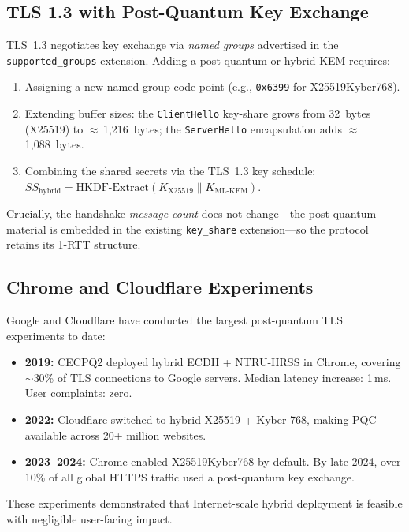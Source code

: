 \subsection{TLS 1.3 with Post-Quantum Key Exchange}
\label{subsec:tls13-pq}

TLS~1.3 negotiates key exchange via \emph{named groups} advertised in the \texttt{supported\_groups} extension.  Adding a post-quantum or hybrid KEM requires:
\begin{enumerate}
\item Assigning a new named-group code point (e.g., \texttt{0x6399} for X25519Kyber768).
\item Extending buffer sizes: the \texttt{ClientHello} key-share grows from 32~bytes (X25519) to $\approx$\,1{,}216~bytes; the \texttt{ServerHello} encapsulation adds $\approx$\,1{,}088~bytes.
\item Combining the shared secrets via the TLS~1.3 key schedule: $\mathit{SS}_{\mathrm{hybrid}} = \mathrm{HKDF\text{-}Extract}(K_{\mathrm{X25519}} \| K_{\mathrm{ML\text{-}KEM}})$.
\end{enumerate}

Crucially, the handshake \emph{message count} does not change---the post-quantum material is embedded in the existing \texttt{key\_share} extension---so the protocol retains its 1-RTT structure.

\subsection{Chrome and Cloudflare Experiments}
\label{subsec:chrome-cloudflare}

\begin{example}
\label{ex:cecpq2}
Google and Cloudflare have conducted the largest post-quantum TLS experiments to date:
\begin{itemize}
\item \textbf{2019:} CECPQ2 deployed hybrid ECDH + NTRU-HRSS in Chrome, covering $\sim$30\% of TLS connections to Google servers.  Median latency increase: 1\,ms.  User complaints: zero.
\item \textbf{2022:} Cloudflare switched to hybrid X25519 + Kyber-768, making PQC available across 20+ million websites.
\item \textbf{2023--2024:} Chrome enabled X25519Kyber768 by default.  By late 2024, over 10\% of all global HTTPS traffic used a post-quantum key exchange.
\end{itemize}
These experiments demonstrated that Internet-scale hybrid deployment is feasible with negligible user-facing impact.
\end{example}

